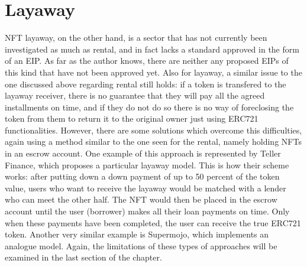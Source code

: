 \documentclass[english, LaM, oneside]{sapthesis}%
\begin{document}
\section{Layaway}
\label{sec:caso}
NFT layaway, on the other hand, is a sector that has not currently been investigated as much as rental, and in fact lacks a standard approved in the form of an EIP. As far as the author knows, there are neither any proposed EIPs of this kind that have not been approved yet.\newline
Also for layaway, a similar issue to the one discussed above regarding rental still holds: if a token is transfered to the layaway receiver, there is no guarantee that they will pay all the agreed installments on time, and if they do not do so there is no way of foreclosing the token from them to return it to the original owner just using ERC721 functionalities.\newline
However, there are some solutions which overcome this difficulties, again using a method similar to the one seen for the rental, namely holding NFTs in an escrow account.\newline 
One example of this approach is represented by Teller Finance\cite{ref:teller}, which proposes a  particular layaway model. This is how their scheme works: after putting down a down payment of up to 50 percent of the token value, users who want to receive the layaway would be matched with a lender who can meet the other half.
The NFT would then be placed in the escrow account until the user (borrower) makes all their loan payments on time. Only when these payments have been completed, the user can receive the true ERC721 token.\newline
Another very similar example is Supermojo\cite{ref:supermojo}, which implements an analogue model.\newline
Again, the limitations of these types of approaches will be examined in the last section of the chapter.
\end{document}
